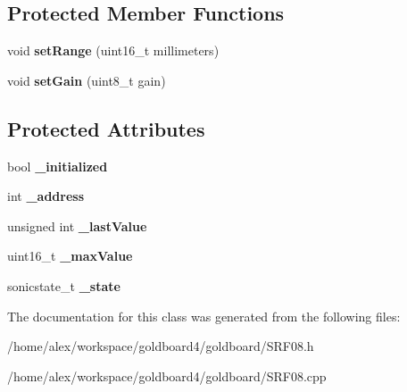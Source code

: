 \subsection*{Protected Member Functions}
\begin{DoxyCompactItemize}
\item 
void {\bfseries set\+Range} (uint16\+\_\+t millimeters)\hypertarget{class_s_r_f08_a4317b5ec7dffe3c83542961a77a59e74}{}\label{class_s_r_f08_a4317b5ec7dffe3c83542961a77a59e74}

\item 
void {\bfseries set\+Gain} (uint8\+\_\+t gain)\hypertarget{class_s_r_f08_ac02024ad486ef18868493afa8836c2a4}{}\label{class_s_r_f08_ac02024ad486ef18868493afa8836c2a4}

\end{DoxyCompactItemize}
\subsection*{Protected Attributes}
\begin{DoxyCompactItemize}
\item 
bool {\bfseries \+\_\+initialized}\hypertarget{class_s_r_f08_a296319571e91e872433fbadc5dd6c84b}{}\label{class_s_r_f08_a296319571e91e872433fbadc5dd6c84b}

\item 
int {\bfseries \+\_\+address}\hypertarget{class_s_r_f08_a853a1be73c9fc3d473dd34ee57110a6d}{}\label{class_s_r_f08_a853a1be73c9fc3d473dd34ee57110a6d}

\item 
unsigned int {\bfseries \+\_\+last\+Value}\hypertarget{class_s_r_f08_a70ed30ace7bde29bfcbf85a48ac12f43}{}\label{class_s_r_f08_a70ed30ace7bde29bfcbf85a48ac12f43}

\item 
uint16\+\_\+t {\bfseries \+\_\+max\+Value}\hypertarget{class_s_r_f08_a489d8f367d124aca63894c23c30aa4ea}{}\label{class_s_r_f08_a489d8f367d124aca63894c23c30aa4ea}

\item 
sonicstate\+\_\+t {\bfseries \+\_\+state}\hypertarget{class_s_r_f08_a4397ea316e60ffa169ee8de39b445a49}{}\label{class_s_r_f08_a4397ea316e60ffa169ee8de39b445a49}

\end{DoxyCompactItemize}


The documentation for this class was generated from the following files\+:\begin{DoxyCompactItemize}
\item 
/home/alex/workspace/goldboard4/goldboard/S\+R\+F08.\+h\item 
/home/alex/workspace/goldboard4/goldboard/S\+R\+F08.\+cpp\end{DoxyCompactItemize}
